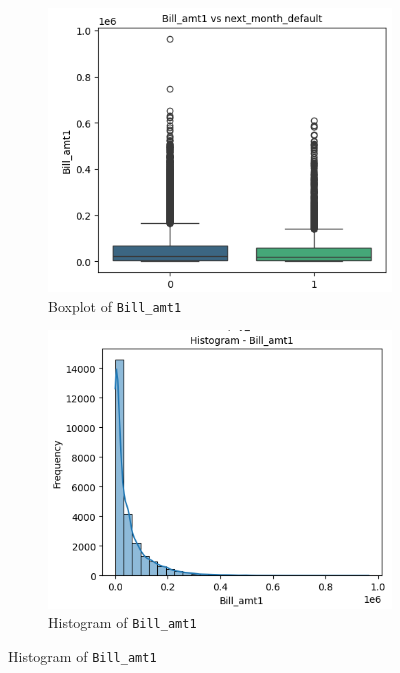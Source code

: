 \documentclass[12pt,a4paper]{article}
\begin{document}
\begin{figure}[H]
    \centering
    \begin{subfigure}[b]{0.32\textwidth}
        \centering
        \includegraphics[width=\linewidth]{figures/2a.png}
        \caption{Boxplot of \texttt{Bill\_amt1}}
        \label{fig:univar_a}
    \end{subfigure}\hfill
    \begin{subfigure}[b]{0.32\textwidth}
        \centering
        \includegraphics[width=\linewidth]{figures/2b.png}
        \caption{Histogram of \texttt{Bill\_amt1}}

\end{subfigure}
\end{figure}
\end{document}
